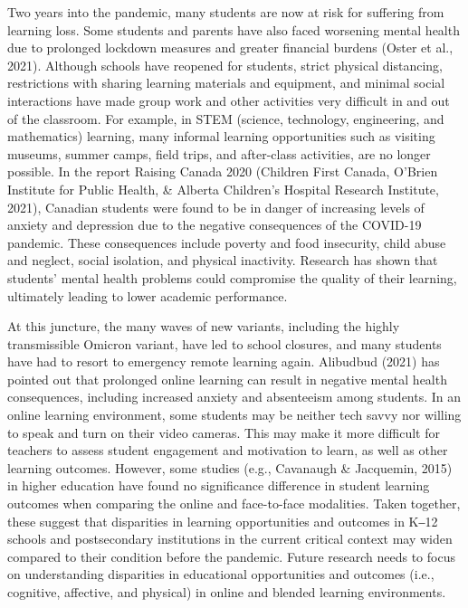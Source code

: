 \documentclass[
]{book}
\begin{document}
Two years into the pandemic, many students are now at risk for suffering from learning loss. Some students and parents have also faced worsening mental health due to prolonged lockdown measures and greater financial burdens (Oster et al., 2021). Although schools have reopened for students, strict physical distancing, restrictions with sharing learning materials and equipment, and minimal social interactions have made group work and other activities very difficult in and out of the classroom. For example, in STEM (science, technology, engineering, and mathematics) learning, many informal learning opportunities such as visiting museums, summer camps, field trips, and after-class activities, are no longer possible. In the report Raising Canada 2020 (Children First Canada, O'Brien Institute for Public Health, \& Alberta Children's Hospital Research Institute, 2021), Canadian students were found to be in danger of increasing levels of anxiety and depression due to the negative consequences of the COVID-19 pandemic. These consequences include poverty and food insecurity, child abuse and neglect, social isolation, and physical inactivity. Research has shown that students' mental health problems could compromise the quality of their learning, ultimately leading to lower academic performance.

At this juncture, the many waves of new variants, including the highly transmissible Omicron variant, have led to school closures, and many students have had to resort to emergency remote learning again. Alibudbud (2021) has pointed out that prolonged online learning can result in negative mental health consequences, including increased anxiety and absenteeism among students. In an online learning environment, some students may be neither tech savvy nor willing to speak and turn on their video cameras. This may make it more difficult for teachers to assess student engagement and motivation to learn, as well as other learning outcomes. However, some studies (e.g., Cavanaugh \& Jacquemin, 2015) in higher education have found no significance difference in student learning outcomes when comparing the online and face-to-face modalities. Taken together, these suggest that disparities in learning opportunities and outcomes in K‒12 schools and postsecondary institutions in the current critical context may widen compared to their condition before the pandemic. Future research needs to focus on understanding disparities in educational opportunities and outcomes (i.e., cognitive, affective, and physical) in online and blended learning environments.
\end{document}
